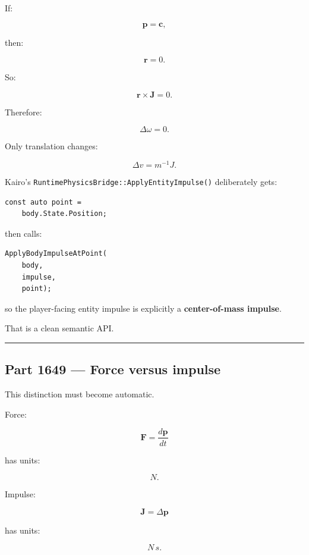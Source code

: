 \hypertarget{06-engine-ii-ch036-part-1648-applying-an-impulse-at-center-of-mass}{}

If:

\[
\mathbf p=\mathbf c,
\]

then:

\[
\mathbf r=0.
\]

So:

\[
\mathbf r\times\mathbf J=0.
\]

Therefore:

\[
\Delta\omega=0.
\]

Only translation changes:

\[
\boxed{
\Delta v=m^{-1}J.
}
\]

Kairo's \texttt{RuntimePhysicsBridge::ApplyEntityImpulse()} deliberately gets:

\begin{verbatim}
const auto point =
    body.State.Position;
\end{verbatim}

then calls:

\begin{verbatim}
ApplyBodyImpulseAtPoint(
    body,
    impulse,
    point);
\end{verbatim}

so the player-facing entity impulse is explicitly a \textbf{center-of-mass impulse}.

That is a clean semantic API.

\begin{center}\rule{0.5\linewidth}{0.5pt}\end{center}

\subsection{Part 1649 --- Force versus impulse}\label{06-engine-ii-ch036-part-1649-force-versus-impulse}

\hypertarget{06-engine-ii-ch036-part-1649-force-versus-impulse}{}

This distinction must become automatic.

Force:

\[
\boxed{
\mathbf F
=
\frac{d\mathbf p}{dt}
}
\]

has units:

\[
N.
\]

Impulse:

\[
\boxed{
\mathbf J
=
\Delta\mathbf p
}
\]

has units:

\[
N\,s.
\]

